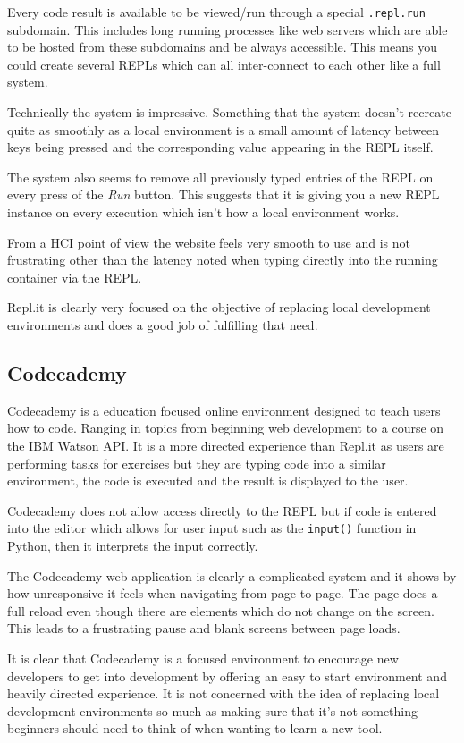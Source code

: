 Every code result is available to be viewed/run through a special \texttt{.repl.run} subdomain. This includes long running processes like web servers which are able to be hosted from these subdomains and be always accessible. This means you could create several REPLs which can all inter-connect to each other like a full system.

Technically the system is impressive. Something that the system doesn't recreate quite as smoothly as a local environment is a small amount of latency between keys being pressed and the corresponding value appearing in the REPL itself.

The system also seems to remove all previously typed entries of the REPL on every press of the \textit{Run} button. This suggests that it is giving you a new REPL instance on every execution which isn't how a local environment works.

From a HCI point of view the website feels very smooth to use and is not frustrating other than the latency noted when typing directly into the running container via the REPL.

Repl.it is clearly very focused on the objective of replacing local development environments and does a good job of fulfilling that need.

\subsection{Codecademy}
Codecademy is a education focused online environment designed to teach users how to code. Ranging in topics from beginning web development to a course on the IBM Watson API. It is a more directed experience than Repl.it as users are performing tasks for exercises but they are typing code into a similar environment, the code is executed and the result is displayed to the user.

Codecademy does not allow access directly to the REPL but if code is entered into the editor which allows for user input such as the \texttt{input()} function in Python, then it interprets the input correctly.

The Codecademy web application is clearly a complicated system and it shows by how unresponsive it feels when navigating from page to page. The page does a full reload even though there are elements which do not change on the screen. This leads to a frustrating pause and blank screens between page loads.

It is clear that Codecademy is a focused environment to encourage new developers to get into development by offering an easy to start environment and heavily directed experience. It is not concerned with the idea of replacing local development environments so much as making sure that it's not something beginners should need to think of when wanting to learn a new tool.

